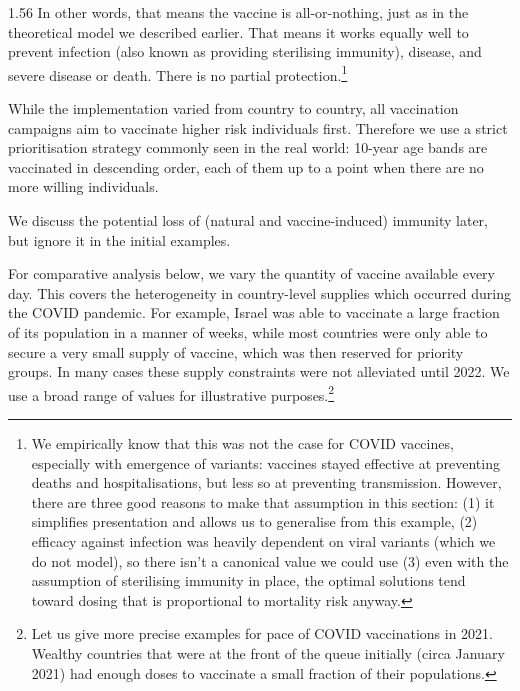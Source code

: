 \documentclass[12pt]{article}
\begin{document}
\begin{spacing}{1.56}
In other words, that means the vaccine is all-or-nothing, just as in the theoretical model we described earlier. That means it works equally well to prevent infection (also known as providing sterilising immunity), disease, and severe disease or death. There is no partial protection.\footnote{We empirically know that this was not the case for COVID vaccines, especially with emergence of variants: vaccines stayed effective at preventing deaths and hospitalisations, but less so at preventing transmission. However, there are three good reasons to make that assumption in this section: (1) it simplifies presentation and allows us to generalise from this example, (2) efficacy against infection was heavily dependent on viral variants (which we do not model), so there isn't a canonical value we could use (3) even with the assumption of sterilising immunity in place, the optimal solutions tend toward dosing that is proportional to mortality risk anyway.} 

While the implementation varied from country to country, all vaccination campaigns aim to vaccinate higher risk individuals first. Therefore we use a strict prioritisation strategy commonly seen in the real world: 10-year age bands are vaccinated in descending order, each of them up to a point when there are no more willing individuals. 



We discuss the potential loss of (natural and vaccine-induced) immunity later, but ignore it in the initial examples.

For comparative analysis below, we vary the quantity of vaccine available every day. This covers the heterogeneity in country-level supplies which occurred during the COVID pandemic. For example, Israel was able to vaccinate a large fraction of its population in a manner of weeks, while most countries were only able to secure a very small supply of vaccine, which was then reserved for priority groups. In many cases these supply constraints were not alleviated until 2022. We use a broad range of values for illustrative purposes.\footnote{Let us give more precise examples for pace of COVID vaccinations in 2021. Wealthy countries that were at the front of the queue initially (circa January 2021) had enough doses to vaccinate a small fraction of their populations. 

}
\end{spacing}
\end{document}
